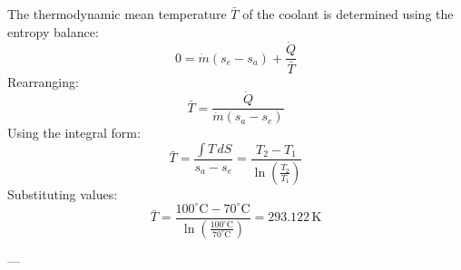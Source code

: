 The thermodynamic mean temperature \( \bar{T} \) of the coolant is determined using the entropy balance:  
\[
0 = \dot{m} (s_e - s_a) + \frac{\dot{Q}}{\bar{T}}
\]  
Rearranging:  
\[
\bar{T} = \frac{\dot{Q}}{\dot{m} (s_a - s_e)}
\]  
Using the integral form:  
\[
\bar{T} = \frac{\int T \, dS}{s_a - s_e} = \frac{T_2 - T_1}{\ln \left( \frac{T_2}{T_1} \right)}
\]  
Substituting values:  
\[
\bar{T} = \frac{100^\circ\text{C} - 70^\circ\text{C}}{\ln \left( \frac{100^\circ\text{C}}{70^\circ\text{C}} \right)} = 293.122 \, \text{K}
\]  

---